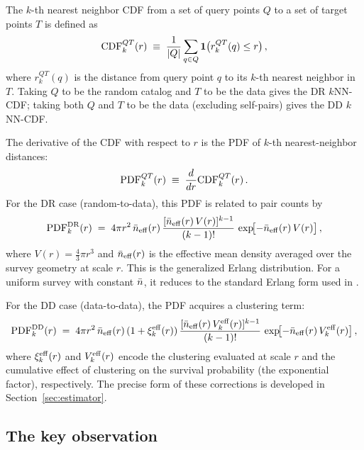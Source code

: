 The $k$-th nearest neighbor CDF from a set of query points $Q$ to a set of target points $T$ is defined as
\begin{equation}
  \mathrm{CDF}^{QT}_{k}(r) \;\equiv\; \frac{1}{|Q|}\sum_{q \in Q} \mathbf{1}\bigl(r^{QT}_{k}(q) \leq r\bigr)\,,
  \label{eq:cdf_def}
\end{equation}
where $r^{QT}_k(q)$ is the distance from query point $q$ to its $k$-th nearest neighbor in $T$.  Taking $Q$ to be the random catalog and $T$ to be the data gives the DR $k$NN-CDF; taking both $Q$ and $T$ to be the data (excluding self-pairs) gives the DD $k$NN-CDF.

The derivative of the CDF with respect to $r$ is the PDF of $k$-th nearest-neighbor distances:
\begin{equation}
  \mathrm{PDF}^{QT}_k(r) \;\equiv\; \frac{d}{dr}\mathrm{CDF}^{QT}_k(r)\,.
  \label{eq:pdf_def}
\end{equation}
For the DR case (random-to-data), this PDF is related to pair counts by
\begin{equation}
  \mathrm{PDF}^{\mathrm{DR}}_k(r) \;=\; 4\pi r^2\,\bar{n}_{\rm eff}(r)\,\frac{[\bar{n}_{\rm eff}(r)\,V(r)]^{k-1}}{(k-1)!}\,\exp\!\bigl[-\bar{n}_{\rm eff}(r)\,V(r)\bigr]\,,
  \label{eq:pdf_DR}
\end{equation}
where $V(r) = \frac{4}{3}\pi r^3$ and $\bar{n}_{\rm eff}(r)$ is the effective mean density averaged over the survey geometry at scale $r$.  This is the generalized Erlang distribution.  For a uniform survey with constant $\bar{n}$, it reduces to the standard Erlang form used in \citet{Banerjee2020}.

For the DD case (data-to-data), the PDF acquires a clustering term:
\begin{equation}
  \mathrm{PDF}^{\mathrm{DD}}_k(r) \;=\; 4\pi r^2\,\bar{n}_{\rm eff}(r)\,(1 + \xi_k^{\rm eff}(r))\,\frac{[\bar{n}_{\rm eff}(r)\,V_k^{\rm eff}(r)]^{k-1}}{(k-1)!}\,\exp\!\bigl[-\bar{n}_{\rm eff}(r)\,V_k^{\rm eff}(r)\bigr]\,,
  \label{eq:pdf_DD}
\end{equation}
where $\xi_k^{\rm eff}(r)$ and $V_k^{\rm eff}(r)$ encode the clustering evaluated at scale $r$ and the cumulative effect of clustering on the survival probability (the exponential factor), respectively.  The precise form of these corrections is developed in Section~\ref{sec:estimator}.

\subsection{The key observation}
\label{sec:key_observation}

